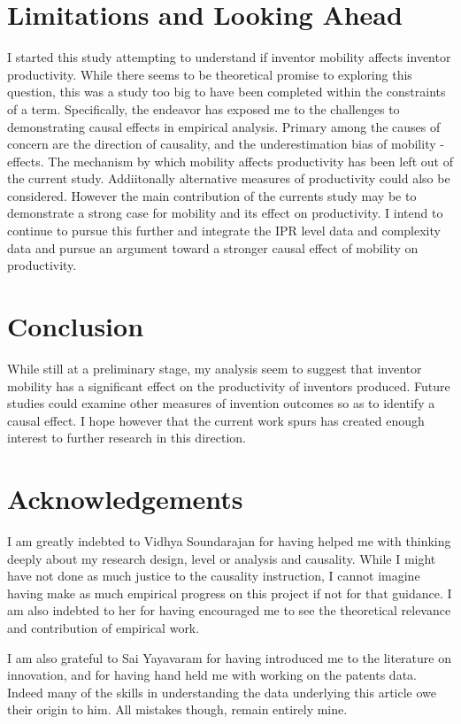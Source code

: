 \documentclass[12pt]{article}
\begin{document}
\section{Limitations and Looking Ahead}
I started this study attempting to understand if inventor mobility affects inventor productivity. While there seems to be theoretical promise to exploring this question, this was a study too big to have been completed within the constraints of a term. Specifically, the endeavor has exposed me to the challenges to demonstrating causal effects in empirical analysis. Primary among the causes of concern are the direction of causality, and the underestimation bias of mobility - effects. The mechanism by which mobility affects productivity has been left out of the current study. Addiitonally alternative measures of productivity could also be considered. However the main contribution of the currents study may be to demonstrate a strong case for mobility and its effect on productivity.  I intend to continue to pursue this further and integrate the IPR level data and complexity data and pursue an argument toward a stronger causal effect of mobility on productivity.

\section{Conclusion}
While still at a preliminary stage, my analysis seem to suggest that inventor mobility  has a significant effect on the productivity of inventors produced. Future studies could  examine other measures of invention outcomes so as to identify a causal effect. I hope however that the current work spurs has created enough interest to further research in this direction.


\section*{Acknowledgements}
I am greatly indebted to Vidhya Soundarajan for having helped me with thinking deeply about my research design, level or analysis and causality. While I might have not done as much justice to the causality instruction, I cannot imagine having make as much empirical progress on this project if not for that guidance. I am also indebted to her for having encouraged me to see the theoretical relevance and contribution of empirical work.

I am also grateful to Sai Yayavaram for having introduced me to the literature on innovation, and for having hand held me with working on the patents data. Indeed many of the skills in understanding the data underlying this article owe their origin to him. All mistakes though, remain entirely mine.
\end{document}
